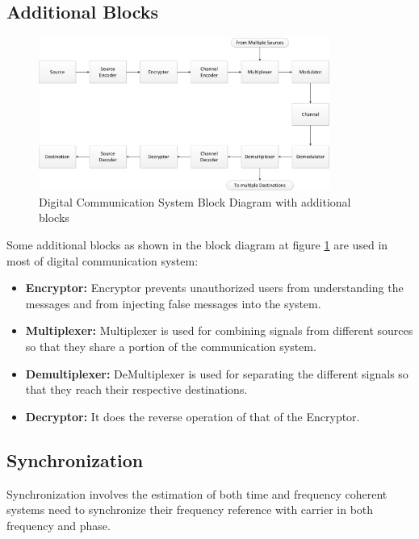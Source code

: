 \subsection{Additional Blocks}
\begin{figure}[htbp]
    \centering
    \includegraphics[width=0.85\textwidth]{./figures/digicom_plus}
    \caption{ Digital Communication System Block Diagram with additional blocks
    \label{fig:digicomplus}}
\end{figure}

Some additional blocks as shown in the block diagram  at figure \ref{fig:digicomplus}
are used in most of digital communication system:

\begin{itemize}

  \item \textbf{Encryptor:} Encryptor prevents unauthorized users from
understanding the messages and from injecting false messages into the system.

  \item \textbf{Multiplexer:} Multiplexer is used for combining signals from
different sources so that they share a portion of the communication system.

  \item \textbf{Demultiplexer:} DeMultiplexer is used for separating the different
signals so that they reach their respective destinations.

  \item \textbf{Decryptor:} It does the reverse operation of that of the Encryptor.

\end{itemize}

\subsection{Synchronization}

Synchronization involves the estimation of both time and frequency coherent
systems need to synchronize their frequency reference with carrier in both
frequency and phase.

